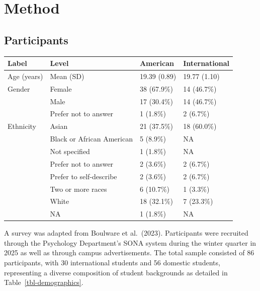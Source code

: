 \documentclass[
  man,
  floatsintext,
  longtable,
  nolmodern,
  notxfonts,
  notimes,
  colorlinks=true,linkcolor=blue,citecolor=blue,urlcolor=blue]{apa7}
\begin{document}
\section{Method}\label{method}

\subsection{Participants}\label{participants}

\begin{table}

{\caption{{Demographic Characteristics of
Participants}{\label{tbl-demographics}}}
\vspace{-20pt}}

\begin{longtable*}[t]{llll}
\toprule
Label & Level & American & International\\
\midrule
Age (years) & Mean (SD) & 19.39 (0.89) & 19.77 (1.10)\\
Gender & Female & 38 (67.9\%) & 14 (46.7\%)\\
 & Male & 17 (30.4\%) & 14 (46.7\%)\\
 & Prefer not to answer & 1 (1.8\%) & 2 (6.7\%)\\
Ethnicity & Asian & 21 (37.5\%) & 18 (60.0\%)\\
\addlinespace
 & Black or African American & 5 (8.9\%) & NA\\
 & Not specified & 1 (1.8\%) & NA\\
 & Prefer not to answer & 2 (3.6\%) & 2 (6.7\%)\\
 & Prefer to self-describe & 2 (3.6\%) & 2 (6.7\%)\\
 & Two or more races & 6 (10.7\%) & 1 (3.3\%)\\
\addlinespace
 & White & 18 (32.1\%) & 7 (23.3\%)\\
 & NA & 1 (1.8\%) & NA\\
\bottomrule
\end{longtable*}

\end{table}

A survey was adapted from Boulware et al.~(2023). Participants were
recruited through the Psychology Department's SONA system during the
winter quarter in 2025 as well as through campus advertisements. The
total sample consisted of 86 participants, with 30 international
students and 56 domestic students, representing a diverse composition of
student backgrounds as detailed in Table~\ref{tbl-demographics}.
\end{document}
